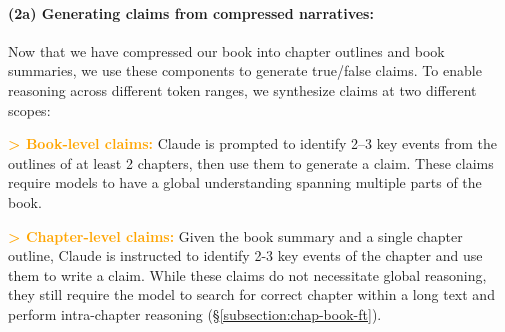 \paragraph{(2a) Generating claims from compressed narratives:} Now that we have compressed our book into chapter outlines and book summaries, we use these components to generate true/false claims. To enable reasoning across different token ranges, we synthesize claims at two different scopes: 

\vspace{2pt}
\noindent \textcolor{orange}{\textbf{> Book-level claims:}} Claude is prompted to identify 2–3 key events from the outlines of at least 2 chapters, then use them to generate a claim. These claims require models to have a global understanding spanning multiple parts of the book.

\vspace{2pt}
\noindent \textcolor{orange}{\textbf{> Chapter-level claims:}} Given the book summary and a single chapter outline, Claude is instructed to identify 2-3 key events of the chapter and use them to write a claim. While these claims do not necessitate global reasoning, they still require the model to search for correct chapter within a long text and perform intra-chapter reasoning (\S\ref{subsection:chap-book-ft}).




